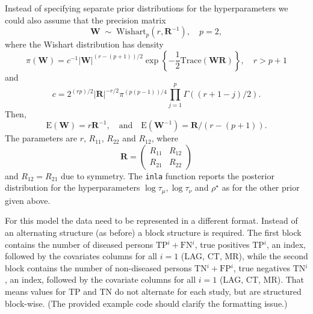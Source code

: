 \documentclass[a4paper,11pt]{article}
\def\mm#1{\ensuremath{\boldsymbol{#1}}} %
\begin{document}
\clearpage
Instead of specifying separate prior distributions for the hyperparameters
we could also assume that the precision matrix
\begin{displaymath}
	  \mathbf{W}\;\sim\;\text{Wishart}_{p}(r, \mm{R}^{-1}), \quad p=2,
\end{displaymath}
where the Wishart distribution has density
\begin{displaymath}
    \pi(\mathbf{W}) = c^{-1} |\mathbf{W}|^{(r-(p+1))/2} \exp\left\{
      -\frac{1}{2}\text{Trace}(\mathbf{W}\mathbf{R})\right\}, \quad r > p+1
\end{displaymath}
and
\begin{displaymath}
    c = 2^{(rp)/2} |\mathbf{R}|^{-r/2} \pi^{(p(p-1))/4}\prod_{j=1}^{p}
    \Gamma((r+1-j)/2).
\end{displaymath}
Then,
\begin{displaymath}
    \text{E}(\mathbf{W}) = r\mathbf{R}^{-1}, \quad\text{and}\quad
    \text{E}(\mathbf{W}^{-1}) = \mathbf{R}/(r-(p+1)).
\end{displaymath}
The parameters are $r$, $R_{11}$, $R_{22}$ and $R_{12}$, where
\begin{displaymath}
    \mm{R} =
    \begin{pmatrix}
        R_{11} &R_{12}\\
        R_{21} & R_{22}
    \end{pmatrix}
\end{displaymath}
and $R_{12} = R_{21}$ due to symmetry.  The {\tt inla} function reports the posterior 
distribution for the  hyperparameters $\log \tau_\mu, \log \tau_\nu$ and $\rho^\star$  
as for the other prior given above.

For this model the data need to be represented in a different format.
Instead of an alternating structure (as before) a block structure is required.
The first block contains the number of diseased persons
$\text{TP}{^i}+\text{FN}{^i}$, true positives $\text{TP}{^i}$, an index,
followed by the covariates columns for all $i=1$ (LAG, CT, MR), 
while the second block contains
the number of non-diseased persons $\text{TN}{^i}+\text{FP}{^i}$, 
true negatives $\text{TN}{^i}$, an index, followed by the covariate 
columns for all $i=1$ (LAG, CT, MR). That means values for TP and TN do not
alternate for each study, but are structured block-wise.
(The provided example code should clarify the formatting issue.)



\end{document}

